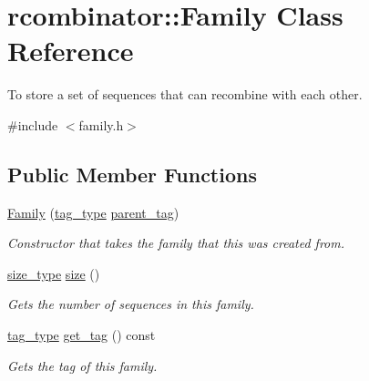 \hypertarget{classrcombinator_1_1Family}{}\section{rcombinator\+:\+:Family Class Reference}
\label{classrcombinator_1_1Family}


To store a set of sequences that can recombine with each other.  




{\ttfamily \#include $<$family.\+h$>$}

\subsection*{Public Member Functions}
\begin{DoxyCompactItemize}
\item 
\mbox{\hyperlink{classrcombinator_1_1Family_aefb8619ac695a3ad8e654ed8302668ee}{Family}} (\mbox{\hyperlink{constants_8h_a3e6daf1646e952257330d8cfe20e96f8}{tag\+\_\+type}} \mbox{\hyperlink{classrcombinator_1_1Family_adfb3bf4271451de8917ea1ababd43b07}{parent\+\_\+tag}})
\begin{DoxyCompactList}\small\item\em Constructor that takes the family that this was created from. \end{DoxyCompactList}\item 
\mbox{\label{classrcombinator_1_1Family_a436d25906d1d686d01b505c78fff9e15}} 
\mbox{\hyperlink{constants_8h_abcd18a5521fc90ff6e7b00e4fee98397}{size\+\_\+type}} \mbox{\hyperlink{classrcombinator_1_1Family_a436d25906d1d686d01b505c78fff9e15}{size}} ()
\begin{DoxyCompactList}\small\item\em Gets the number of sequences in this family. \end{DoxyCompactList}\item 
\mbox{\label{classrcombinator_1_1Family_a5cba1e4d38819bf4b9c334226979e3e4}} 
\mbox{\hyperlink{constants_8h_a3e6daf1646e952257330d8cfe20e96f8}{tag\+\_\+type}} \mbox{\hyperlink{classrcombinator_1_1Family_a5cba1e4d38819bf4b9c334226979e3e4}{get\+\_\+tag}} () const
\begin{DoxyCompactList}\small\item\em Gets the tag of this family. \end{DoxyCompactList}\item 

\end{DoxyCompactItemize}
